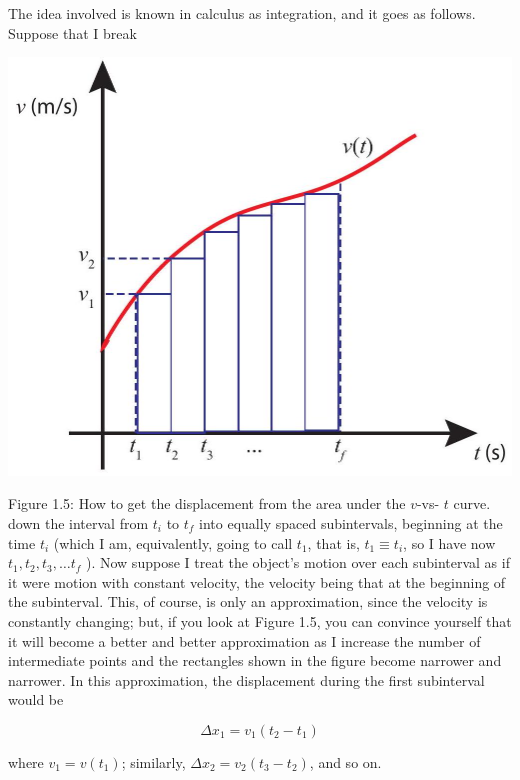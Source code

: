 \documentclass[10pt]{article}
\begin{document}
The idea involved is known in calculus as integration, and it goes as follows. Suppose that I break

\begin{center}
\includegraphics[max width=\textwidth]{2024_09_14_9969b06773f10b6936e8g-030}
\end{center}

Figure 1.5: How to get the displacement from the area under the $v$-vs- $t$ curve.\\
down the interval from $t_{i}$ to $t_{f}$ into equally spaced subintervals, beginning at the time $t_{i}$ (which I am, equivalently, going to call $t_{1}$, that is, $t_{1} \equiv t_{i}$, so I have now $t_{1}, t_{2}, t_{3}, \ldots t_{f}$ ). Now suppose I treat the object's motion over each subinterval as if it were motion with constant velocity, the velocity being that at the beginning of the subinterval. This, of course, is only an approximation, since the velocity is constantly changing; but, if you look at Figure 1.5, you can convince yourself that it will become a better and better approximation as I increase the number of intermediate points and the rectangles shown in the figure become narrower and narrower. In this approximation, the displacement during the first subinterval would be


\begin{equation*}
\Delta x_{1}=v_{1}\left(t_{2}-t_{1}\right) \tag{1.11}
\end{equation*}


where $v_{1}=v\left(t_{1}\right)$; similarly, $\Delta x_{2}=v_{2}\left(t_{3}-t_{2}\right)$, and so on.
\end{document}
